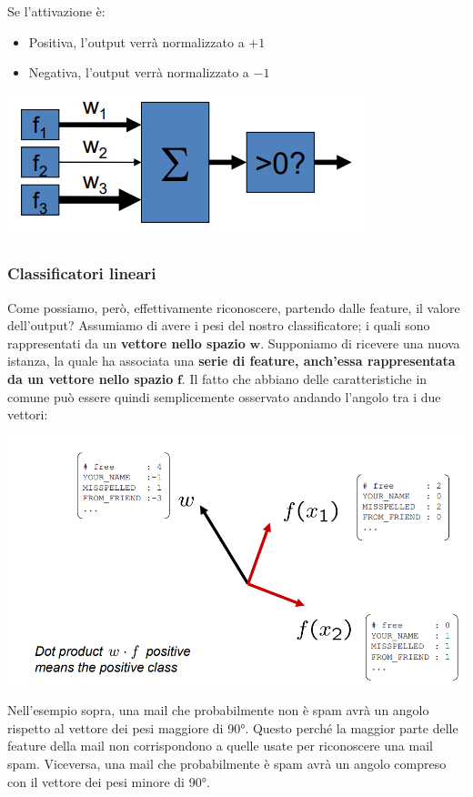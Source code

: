 \documentclass[12pt]{article}
\begin{document}
\newpage \noindent
Se l'attivazione è:
\begin{itemize}
    \item Positiva, l'output verrà normalizzato a $+1$
    \item Negativa, l'output verrà normalizzato a $-1$
\end{itemize}
\begin{center}
    \includegraphics[width =0.50\linewidth]{Images/87.PNG}
\end{center}
\subsubsection{Classificatori lineari}
Come possiamo, però, effettivamente riconoscere, partendo dalle feature, il valore dell'output?
Assumiamo di avere i pesi del nostro classificatore; i quali sono rappresentati da un \textbf{vettore nello spazio} $\boldsymbol{w}$.
Supponiamo di ricevere una nuova istanza, la quale ha associata una \textbf{serie di feature, anch'essa rappresentata da un vettore nello spazio} $\boldsymbol{f}$.
Il fatto che abbiano delle caratteristiche in comune può essere quindi semplicemente osservato andando l'angolo tra i due vettori:
\begin{center}
    \includegraphics[width =0.80\linewidth]{Images/88.PNG}
\end{center}
Nell'esempio sopra, una mail che probabilmente non è spam avrà un angolo rispetto al vettore dei pesi maggiore di 90°.
Questo perché la maggior parte delle feature della mail non corrispondono a quelle usate per riconoscere una mail spam.
Viceversa, una mail che probabilmente è spam avrà un angolo compreso con il vettore dei pesi minore di 90°.
\end{document}
